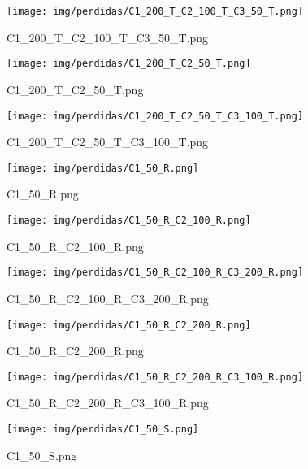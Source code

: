 \begin{figure}[H]
    \centerline{\texttt{[image: img/perdidas/C1\_200\_T\_C2\_100\_T\_C3\_50\_T.png]}}
    \caption{C1_200_T_C2_100_T_C3_50_T.png}
    \label{fig:C1_200_T_C2_100_T_C3_50_T.png}
\end{figure}

\begin{figure}[H]
    \centerline{\texttt{[image: img/perdidas/C1\_200\_T\_C2\_50\_T.png]}}
    \caption{C1_200_T_C2_50_T.png}
    \label{fig:C1_200_T_C2_50_T.png}
\end{figure}

\begin{figure}[H]
    \centerline{\texttt{[image: img/perdidas/C1\_200\_T\_C2\_50\_T\_C3\_100\_T.png]}}
    \caption{C1_200_T_C2_50_T_C3_100_T.png}
    \label{fig:C1_200_T_C2_50_T_C3_100_T.png}
\end{figure}

\begin{figure}[H]
    \centerline{\texttt{[image: img/perdidas/C1\_50\_R.png]}}
    \caption{C1_50_R.png}
    \label{fig:C1_50_R.png}
\end{figure}

\begin{figure}[H]
    \centerline{\texttt{[image: img/perdidas/C1\_50\_R\_C2\_100\_R.png]}}
    \caption{C1_50_R_C2_100_R.png}
    \label{fig:C1_50_R_C2_100_R.png}
\end{figure}

\begin{figure}[H]
    \centerline{\texttt{[image: img/perdidas/C1\_50\_R\_C2\_100\_R\_C3\_200\_R.png]}}
    \caption{C1_50_R_C2_100_R_C3_200_R.png}
    \label{fig:C1_50_R_C2_100_R_C3_200_R.png}
\end{figure}

\begin{figure}[H]
    \centerline{\texttt{[image: img/perdidas/C1\_50\_R\_C2\_200\_R.png]}}
    \caption{C1_50_R_C2_200_R.png}
    \label{fig:C1_50_R_C2_200_R.png}
\end{figure}

\begin{figure}[H]
    \centerline{\texttt{[image: img/perdidas/C1\_50\_R\_C2\_200\_R\_C3\_100\_R.png]}}
    \caption{C1_50_R_C2_200_R_C3_100_R.png}
    \label{fig:C1_50_R_C2_200_R_C3_100_R.png}
\end{figure}

\begin{figure}[H]
    \centerline{\texttt{[image: img/perdidas/C1\_50\_S.png]}}
    \caption{C1_50_S.png}
    \label{fig:C1_50_S.png}
\end{figure}

